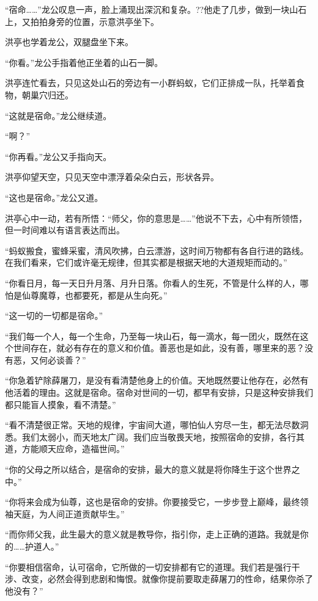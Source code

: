 
\begin{this_body}

“宿命……”龙公叹息一声，脸上涌现出深沉和复杂。??他走了几步，做到一块山石上，又拍拍身旁的位置，示意洪亭坐下。

洪亭也学着龙公，双腿盘坐下来。

“你看。”龙公手指着他正坐着的山石一脚。

洪亭连忙看去，只见这处山石的旁边有一小群蚂蚁，它们正排成一队，托举着食物，朝巢穴归还。

“这就是宿命。”龙公继续道。

“啊？”

“你再看。”龙公又手指向天。

洪亭仰望天空，只见天空中漂浮着朵朵白云，形状各异。

“这也是宿命。”龙公又道。

洪亭心中一动，若有所悟：“师父，你的意思是……”他说不下去，心中有所领悟，但一时间难以有语言表达而出。

“蚂蚁搬食，蜜蜂采蜜，清风吹拂，白云漂游，这时间万物都有各自行进的路线。在我们看来，它们或许毫无规律，但其实都是根据天地的大道规矩而动的。”

“你看日月，每一天日升月落、月升日落。你看人的生死，不管是什么样的人，哪怕是仙尊魔尊，也都要死，都是从生向死。”

“这一切的一切都是宿命。”

“我们每一个人，每一个生命，乃至每一块山石，每一滴水，每一团火，既然在这个世间存在，就必有存在的意义和价值。善恶也是如此，没有善，哪里来的恶？没有恶，又何必谈善？”

“你急着铲除薛屠刀，是没有看清楚他身上的价值。天地既然要让他存在，必然有他活着的理由。这就是宿命。宿命对世间的一切，都早有安排，只是这种安排我们都只能盲人摸象，看不清楚。”

“看不清楚很正常。天地的规律，宇宙间大道，哪怕仙人穷尽一生，都无法尽数洞悉。我们太弱小，而天地太广阔。我们应当敬畏天地，按照宿命的安排，各行其道，方能顺天应命，造福世间。”

“你的父母之所以结合，是宿命的安排，最大的意义就是将你降生于这个世界之中。”

“你将来会成为仙尊，这也是宿命的安排。你要接受它，一步步登上巅峰，最终领袖天庭，为人间正道贡献毕生。”

“而你师父我，此生最大的意义就是教导你，指引你，走上正确的道路。我就是你的……护道人。”

“你要相信宿命，认可宿命，它所做的一切安排都有它的道理。我们若是强行干涉、改变，必然会得到悲剧和悔恨。就像你提前要取走薛屠刀的性命，结果你杀了他没有？”


\end{this_body}
